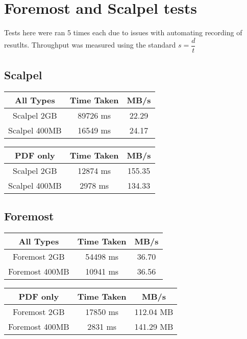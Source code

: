\section{Foremost and Scalpel tests}
\label{sec:SNFappendix}
Tests here were ran 5 times each due to issues with automating recording of resutlts.
Throughput was measured using the standard $s = \dfrac{d}{t}$

\subsection{Scalpel}
{\centering
\begin{tabular}{ c | c | c }
All Types & Time Taken & MB/s \\
\hline
Scalpel 2GB & 89726 ms & 22.29 \\
Scalpel 400MB & 16549 ms & 24.17 \\
\end{tabular}
\label{tab:AverageScalpelAllPatt}
\par}

{\centering
\begin{tabular}{ c | c | c }
PDF only & Time Taken & MB/s \\
\hline
Scalpel 2GB & 12874 ms & 155.35 \\
Scalpel 400MB & 2978 ms & 134.33 \\
\end{tabular}
\label{tab:AverageScalpelPDFPatt}
\par}

\subsection{Foremost}
{\centering
\begin{tabular}{ c | c | c }
All Types & Time Taken & MB/s \\
\hline
Foremost 2GB & 54498 ms & 36.70 \\
Foremost 400MB & 10941 ms & 36.56 \\
\end{tabular}
\label{tab:AverageForemostAllPatt}
\par}

{\centering
\begin{tabular}{ c | c | c }
PDF only & Time Taken & MB/s \\
\hline
Foremost 2GB & 17850 ms & 112.04 MB \\
Foremost 400MB & 2831 ms & 141.29 MB \\
\end{tabular}
\label{tab:AverageForemostPDFPatt}
\par}
